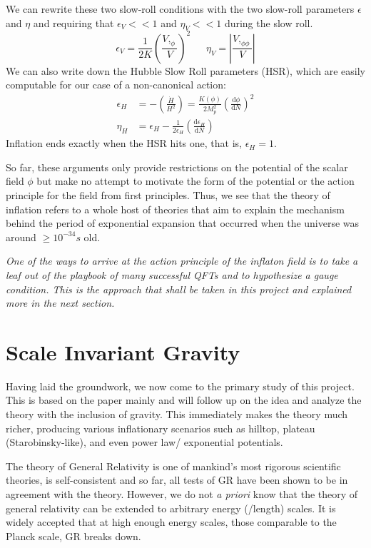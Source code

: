 \documentclass[aps,prd,reprint,preprintnumbers,showpacs,floatfix,nofootinbib,superscript address]{revtex4-2}
\begin{document}
We can rewrite these two slow-roll conditions with the two slow-roll parameters $\epsilon$ and $\eta$ and requiring that $\epsilon_V << 1$ and $\eta_V << 1$ during the slow roll. 
\begin{equation}
    \epsilon_V = \frac{1}{2K}  \left( \frac{V,_{\phi}}{V} \right)^2 \,\,\,\,\,\,\,\,\ \eta_V = \left| \frac{V,_{\phi\phi}}{V} \right|
\end{equation}
We can also write down the Hubble Slow Roll parameters (HSR), which are easily computable for our case of a non-canonical action:
\begin{align}
    \epsilon_H &= -  \left( \frac{\dot{H}}{H^2} \right) = \frac{K(\phi)}{2 M_p^2} \left( \frac{\text{d}\phi}{\text{d}N} \right)^2  \nonumber \\
    \eta_H &= \epsilon_H - \frac{1}{2 \epsilon_H} \left( \frac{\text{d}\epsilon_H}{\text{d}N} \right)
\end{align}
Inflation ends exactly when the HSR hits one, that is, $\epsilon_H = 1$.

So far, these arguments only provide restrictions on the potential of the scalar field $\phi$ but make no attempt to motivate the form of the potential or the action principle for the field from first principles. Thus, we see that the theory of inflation refers to a whole host of theories that aim to explain the mechanism behind the period of exponential expansion that occurred when the universe was around $\geq 10^{-34}s$ old.

\textit{One of the ways to arrive at the action principle of the inflaton field is to take a leaf out of the playbook of many successful QFTs and to hypothesize a gauge condition. This is the approach that shall be taken in this project and explained more in the next section.}


\section{Scale Invariant Gravity} \label{Scale Invariant Gravity}
Having laid the groundwork, we now come to the primary study of this project. This is based on the paper \cite{barker2024poincaregaugetheoryconformal} mainly and will follow up on the idea and analyze the theory with the inclusion of gravity. This immediately makes the theory much richer, producing various inflationary scenarios such as hilltop, plateau (Starobinsky-like), and even power law/ exponential potentials.

The theory of General Relativity is one of mankind's most rigorous scientific theories, is self-consistent and so far, all tests of GR have been shown to be in agreement with the theory. However, we do not \textit{a priori} know that the theory of general relativity can be extended to arbitrary energy (/length) scales. It is widely accepted that at high enough energy scales, those comparable to the Planck scale, GR breaks down. 
\end{document}

